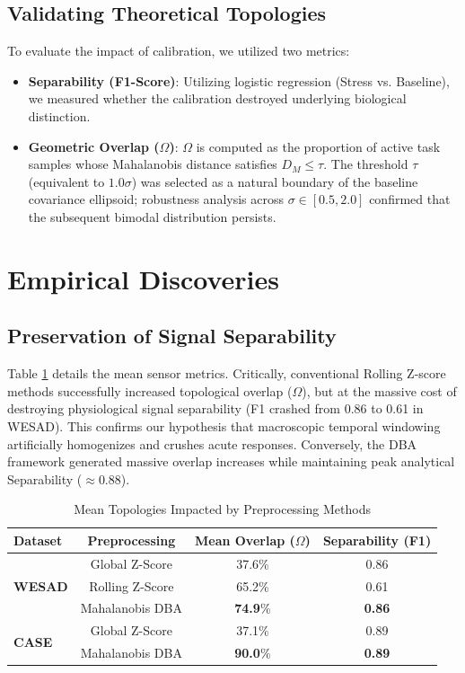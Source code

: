 \documentclass{IEEE_lsens}
\begin{document}
\subsection{Validating Theoretical Topologies}
To evaluate the impact of calibration, we utilized two metrics:
\begin{itemize}
    \item \textbf{Separability (F1-Score)}: Utilizing logistic regression (Stress vs. Baseline), we measured whether the calibration destroyed underlying biological distinction. 
    \item \textbf{Geometric Overlap ($\Omega$)}: $\Omega$ is computed as the proportion of active task samples whose Mahalanobis distance satisfies $D_M \le \tau$. The threshold $\tau$ (equivalent to $1.0\sigma$) was selected as a natural boundary of the baseline covariance ellipsoid; robustness analysis across $\sigma \in [0.5, 2.0]$ confirmed that the subsequent bimodal distribution persists.
\end{itemize}

\section{Empirical Discoveries}

\subsection{Preservation of Signal Separability}
Table \ref{tab:comparison} details the mean sensor metrics. Critically, conventional Rolling Z-score methods successfully increased topological overlap ($\Omega$), but at the massive cost of destroying physiological signal separability (F1 crashed from 0.86 to 0.61 in WESAD). This confirms our hypothesis that macroscopic temporal windowing artificially homogenizes and crushes acute responses. Conversely, the DBA framework generated massive overlap increases while maintaining peak analytical Separability ($\approx 0.88$).

\begin{table}[tb]
\caption{Mean Topologies Impacted by Preprocessing Methods}
\label{tab:comparison}
\centering
\begin{tabular}{lccc}
\toprule
Dataset & Preprocessing & Mean Overlap ($\Omega$) & Separability (F1) \\
\midrule
\multirow{3}{*}{\textbf{WESAD}} 
& Global Z-Score & 37.6\% & 0.86 \\
& Rolling Z-Score & 65.2\% & 0.61 \\
& Mahalanobis DBA & \textbf{74.9}\% & \textbf{0.86} \\
\midrule
\multirow{2}{*}{\textbf{CASE}}
& Global Z-Score & 37.1\% & 0.89 \\
& Mahalanobis DBA & \textbf{90.0}\% & \textbf{0.89} \\
\bottomrule
\end{tabular}
\end{table}
\end{document}
